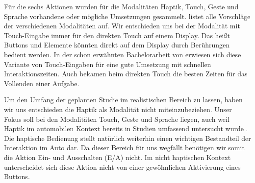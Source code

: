 Für die sechs Aktionen wurden für die Modalitäten Haptik, Touch, Geste und Sprache vorhandene oder mögliche Umsetzungen gesammelt. 
 listet alle Vorschläge der verschiedenen Modalitäten auf.
Wir entschieden uns bei der Modalität mit Touch-Eingabe immer für den direkten Touch auf einem Display. 
Das heißt Buttons und Elemente könnten direkt auf dem Display durch Berührungen bedient werden.
In der schon erwähnten Bachelorarbeit von \citet{stracke2014touch} erwiesen sich diese Variante von Touch-Eingaben für eine gute Umsetzung mit schnellen Interaktionszeiten. 
Auch \citet{Rumelin:2013} bekamen beim direkten Touch die besten Zeiten für das Vollenden einer Aufgabe.

Um den Umfang der geplanten Studie im realistischen Bereich zu lassen, haben wir uns entschieden die Haptik als Modalität nicht miteinzubeziehen. 
Unser Fokus soll bei den Modalitäten Touch, Geste und Sprache liegen, auch weil Haptik im automobilen Kontext bereits in Studien umfassend untersucht wurde \citep{Pettitt_2007, schneegass_2009, SchneegaB_2011}. 
Die haptische Bedienung stellt natürlich weiterhin einen wichtigen Bestandteil der Interaktion im Auto dar.
Da dieser Bereich für uns wegfällt benötigen wir somit die Aktion Ein- und Ausschalten (E/A) nicht. 
Im nicht haptischen Kontext unterscheidet sich diese Aktion nicht von einer gewöhnlichen Aktivierung eines Buttons.

